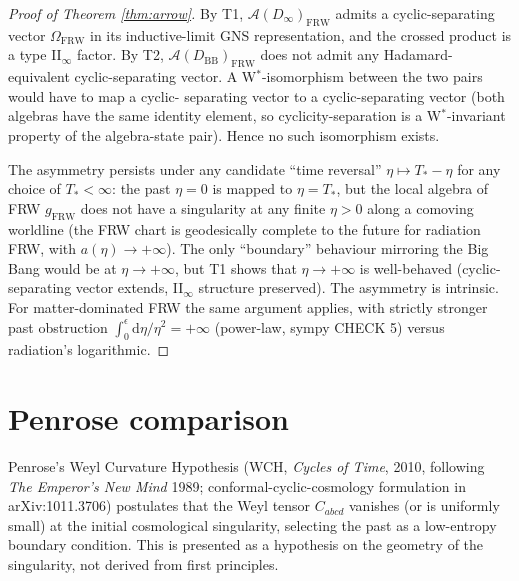 \documentclass[11pt]{article}
\theoremstyle{definition}
\renewcommand{\AA}{\mathcal{A}}
\newcommand{\BB}{\mathrm{BB}}
\newcommand{\FRW}{\mathrm{FRW}}
\begin{document}
\begin{proof}[Proof of Theorem \ref{thm:arrow}]
By T1, $\AA(D_\infty)_\FRW$ admits a cyclic-separating vector
$\Omega_\FRW$ in its inductive-limit GNS representation, and the
crossed product is a type II$_\infty$ factor. By T2, $\AA(D_\BB)_\FRW$
does not admit any Hadamard-equivalent cyclic-separating vector.
A W$^*$-isomorphism between the two pairs would have to map a cyclic-
separating vector to a cyclic-separating vector (both algebras have
the same identity element, so cyclicity-separation is a W$^*$-invariant
property of the algebra-state pair). Hence no such isomorphism exists.

The asymmetry persists under any candidate ``time reversal'' $\eta
\mapsto T_*-\eta$ for any choice of $T_*<\infty$: the past
$\eta=0$ is mapped to $\eta=T_*$, but the local algebra of FRW
$g_\FRW$ does not have a singularity at any finite $\eta>0$ along a
comoving worldline (the FRW chart is geodesically complete to the future
for radiation FRW, with $a(\eta)\to+\infty$). The only ``boundary''
behaviour mirroring the Big Bang would be at $\eta\to+\infty$, but T1
shows that $\eta\to+\infty$ is well-behaved (cyclic-separating vector
extends, II$_\infty$ structure preserved). The asymmetry is intrinsic.
For matter-dominated FRW the same argument applies, with strictly
stronger past obstruction $\int_0^\epsilon\mathrm{d}\eta/\eta^2=+\infty$
(power-law, sympy CHECK 5) versus radiation's logarithmic.
\end{proof}

\section{Penrose comparison}

Penrose's Weyl Curvature Hypothesis (WCH, \emph{Cycles of Time}, 2010,
following \emph{The Emperor's New Mind} 1989; conformal-cyclic-cosmology
formulation in arXiv:1011.3706) postulates that the Weyl tensor $C_{abcd}$
vanishes (or is uniformly small) at the initial cosmological singularity,
selecting the past as a low-entropy boundary condition. This is presented
as a hypothesis on the geometry of the singularity, not derived from
first principles.
\end{document}
